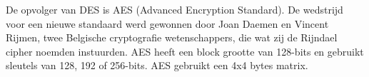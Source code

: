 De opvolger van DES is AES (Advanced Encryption Standard). De wedstrijd voor een nieuwe standaard werd gewonnen door Joan Daemen en Vincent Rijmen, twee Belgische cryptografie wetenschappers, die wat zij de Rijndael cipher noemden instuurden. AES heeft een block grootte van 128-bits en gebruikt sleutels van 128, 192 of 256-bits. AES gebruikt een 4x4 bytes matrix.

